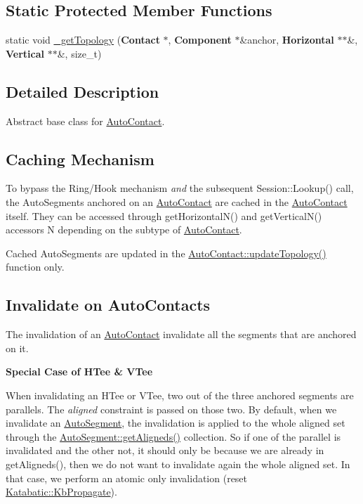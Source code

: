 \subsection*{Static Protected Member Functions}
\begin{DoxyCompactItemize}
\item 
static void \hyperlink{classKatabatic_1_1AutoContact_a2294ddd6bd4bda59c3453cc4dbd4f4fa}{\-\_\-get\-Topology} ({\bf Contact} $\ast$, {\bf Component} $\ast$\&anchor, {\bf Horizontal} $\ast$$\ast$\&, {\bf Vertical} $\ast$$\ast$\&, size\-\_\-t)
\end{DoxyCompactItemize}


\subsection{Detailed Description}
Abstract base class for \hyperlink{classKatabatic_1_1AutoContact}{Auto\-Contact}. 

\hypertarget{classKatabatic_1_1AutoContact_secACCache}{}\subsection{Caching Mechanism}\label{classKatabatic_1_1AutoContact_secACCache}
To bypass the Ring/\-Hook mechanism {\itshape and} the subsequent Session\-::\-Lookup() call, the Auto\-Segments anchored on an \hyperlink{classKatabatic_1_1AutoContact}{Auto\-Contact} are cached in the \hyperlink{classKatabatic_1_1AutoContact}{Auto\-Contact} itself. They can be accessed through {\ttfamily get\-Horizontal\-N()} and get\-Vertical\-N() accessors {\ttfamily N} depending on the subtype of \hyperlink{classKatabatic_1_1AutoContact}{Auto\-Contact}.

Cached Auto\-Segments are updated in the \hyperlink{classKatabatic_1_1AutoContact_a690764ddc997fe9766a79c4b8e0c3e2f}{Auto\-Contact\-::update\-Topology()} function only.\hypertarget{classKatabatic_1_1AutoContact_secACInvalidate}{}\subsection{Invalidate on Auto\-Contacts}\label{classKatabatic_1_1AutoContact_secACInvalidate}
The invalidation of an \hyperlink{classKatabatic_1_1AutoContact}{Auto\-Contact} invalidate all the segments that are anchored on it.

{\bfseries Special Case of H\-Tee \& V\-Tee}

When invalidating an H\-Tee or V\-Tee, two out of the three anchored segments are parallels. The {\itshape aligned} constraint is passed on those two. By default, when we invalidate an \hyperlink{classKatabatic_1_1AutoSegment}{Auto\-Segment}, the invalidation is applied to the whole aligned set through the \hyperlink{classKatabatic_1_1AutoSegment_aaca749f49cd03ca06449d5ea2104033a}{Auto\-Segment\-::get\-Aligneds()} collection. So if one of the parallel is invalidated and the other not, it should only be because we are already in {\ttfamily get\-Aligneds()}, then we do not want to invalidate again the whole aligned set. In that case, we perform an atomic only invalidation (reset \hyperlink{namespaceKatabatic_a2af2ad6b6441614038caf59d04b3b217a3f95c1f06fe0b58b44ccbc57d99f2a5d}{Katabatic\-::\-Kb\-Propagate}).

